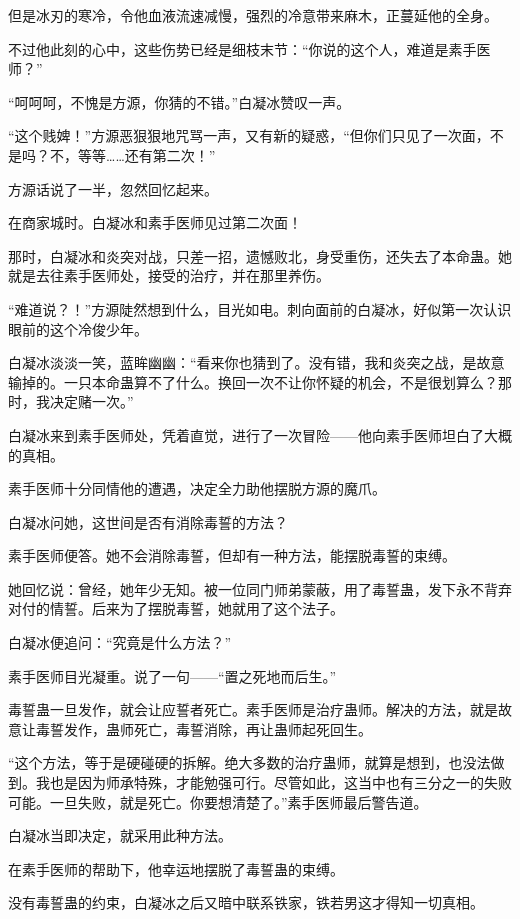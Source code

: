 \begin{this_body}
但是冰刃的寒冷，令他血液流速减慢，强烈的冷意带来麻木，正蔓延他的全身。

不过他此刻的心中，这些伤势已经是细枝末节：“你说的这个人，难道是素手医师？”

“呵呵呵，不愧是方源，你猜的不错。”白凝冰赞叹一声。

“这个贱婢！”方源恶狠狠地咒骂一声，又有新的疑惑，“但你们只见了一次面，不是吗？不，等等……还有第二次！”

方源话说了一半，忽然回忆起来。

在商家城时。白凝冰和素手医师见过第二次面！

那时，白凝冰和炎突对战，只差一招，遗憾败北，身受重伤，还失去了本命蛊。她就是去往素手医师处，接受的治疗，并在那里养伤。

“难道说？！”方源陡然想到什么，目光如电。刺向面前的白凝冰，好似第一次认识眼前的这个冷俊少年。

白凝冰淡淡一笑，蓝眸幽幽：“看来你也猜到了。没有错，我和炎突之战，是故意输掉的。一只本命蛊算不了什么。换回一次不让你怀疑的机会，不是很划算么？那时，我决定赌一次。”

白凝冰来到素手医师处，凭着直觉，进行了一次冒险——他向素手医师坦白了大概的真相。

素手医师十分同情他的遭遇，决定全力助他摆脱方源的魔爪。

白凝冰问她，这世间是否有消除毒誓的方法？

素手医师便答。她不会消除毒誓，但却有一种方法，能摆脱毒誓的束缚。

她回忆说：曾经，她年少无知。被一位同门师弟蒙蔽，用了毒誓蛊，发下永不背弃对付的情誓。后来为了摆脱毒誓，她就用了这个法子。

白凝冰便追问：“究竟是什么方法？”

素手医师目光凝重。说了一句——“置之死地而后生。”

毒誓蛊一旦发作，就会让应誓者死亡。素手医师是治疗蛊师。解决的方法，就是故意让毒誓发作，蛊师死亡，毒誓消除，再让蛊师起死回生。

“这个方法，等于是硬碰硬的拆解。绝大多数的治疗蛊师，就算是想到，也没法做到。我也是因为师承特殊，才能勉强可行。尽管如此，这当中也有三分之一的失败可能。一旦失败，就是死亡。你要想清楚了。”素手医师最后警告道。

白凝冰当即决定，就采用此种方法。

在素手医师的帮助下，他幸运地摆脱了毒誓蛊的束缚。

没有毒誓蛊的约束，白凝冰之后又暗中联系铁家，铁若男这才得知一切真相。


\end{this_body}
